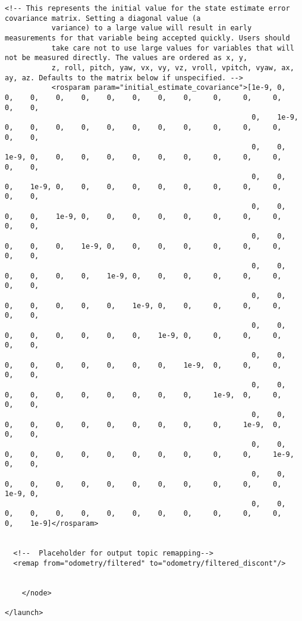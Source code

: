 \begin{lstlisting}[breaklines=true,basicstyle=\tiny]
      <!-- This represents the initial value for the state estimate error covariance matrix. Setting a diagonal value (a
           variance) to a large value will result in early measurements for that variable being accepted quickly. Users should
           take care not to use large values for variables that will not be measured directly. The values are ordered as x, y,
           z, roll, pitch, yaw, vx, vy, vz, vroll, vpitch, vyaw, ax, ay, az. Defaults to the matrix below if unspecified. -->
           <rosparam param="initial_estimate_covariance">[1e-9, 0,    0,    0,    0,    0,    0,    0,    0,    0,     0,     0,     0,    0,    0,
                                                          0,    1e-9, 0,    0,    0,    0,    0,    0,    0,    0,     0,     0,     0,    0,    0,
                                                          0,    0,    1e-9, 0,    0,    0,    0,    0,    0,    0,     0,     0,     0,    0,    0,
                                                          0,    0,    0,    1e-9, 0,    0,    0,    0,    0,    0,     0,     0,     0,    0,    0,
                                                          0,    0,    0,    0,    1e-9, 0,    0,    0,    0,    0,     0,     0,     0,    0,    0,
                                                          0,    0,    0,    0,    0,    1e-9, 0,    0,    0,    0,     0,     0,     0,    0,    0,
                                                          0,    0,    0,    0,    0,    0,    1e-9, 0,    0,    0,     0,     0,     0,    0,    0,
                                                          0,    0,    0,    0,    0,    0,    0,    1e-9, 0,    0,     0,     0,     0,    0,    0,
                                                          0,    0,    0,    0,    0,    0,    0,    0,    1e-9, 0,     0,     0,     0,    0,    0,
                                                          0,    0,    0,    0,    0,    0,    0,    0,    0,    1e-9,  0,     0,     0,    0,    0,
                                                          0,    0,    0,    0,    0,    0,    0,    0,    0,    0,     1e-9,  0,     0,    0,    0,
                                                          0,    0,    0,    0,    0,    0,    0,    0,    0,    0,     0,     1e-9,  0,    0,    0,
                                                          0,    0,    0,    0,    0,    0,    0,    0,    0,    0,     0,     0,     1e-9, 0,    0,
                                                          0,    0,    0,    0,    0,    0,    0,    0,    0,    0,     0,     0,     0,    1e-9, 0,
                                                          0,    0,    0,    0,    0,    0,    0,    0,    0,    0,     0,     0,     0,    0,    1e-9]</rosparam>


  <!--  Placeholder for output topic remapping-->
  <remap from="odometry/filtered" to="odometry/filtered_discont"/>
      

    </node>
    
</launch>

\end{lstlisting}



